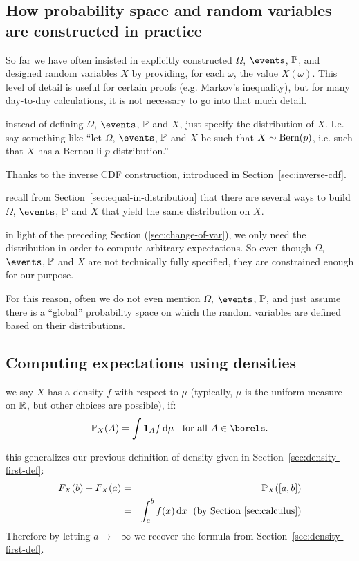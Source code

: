 \documentclass{article}
\begin{document}
\subsection{How probability space and random variables are constructed in practice}\label{sec:using-rv-to-construct-prs}

So far we have often insisted in explicitly constructed $\Omega$, $\events$, $\P$, and designed random variables $X$ by providing, for each $\omega$, the value $X(\omega)$. This level of detail is useful for certain proofs (e.g. Markov's inequality), but for many day-to-day calculations, it is not necessary to go into that much detail. 

 instead of defining $\Omega$, $\events$, $\P$ and $X$, just specify the distribution of $X$. I.e. say something like ``let $\Omega$, $\events$, $\P$ and $X$ be such that $X \sim \Bern(p)$, i.e. such that $X$ has a Bernoulli $p$ distribution.'' 

 Thanks to the inverse CDF construction, introduced in Section~\ref{sec:inverse-cdf}. 

 recall from Section~\ref{sec:equal-in-distribution} that there are several ways to build $\Omega$, $\events$, $\P$ and $X$ that yield the same distribution on $X$.

 in light of the preceding Section (\ref{sec:change-of-var}), we only need the distribution in order to compute arbitrary expectations. So even though $\Omega$, $\events$, $\P$ and $X$ are not technically fully specified, they are constrained enough for our purpose.

For this reason, often we do not even mention $\Omega$, $\events$, $\P$, and just assume there is a ``global'' probability space on which the random variables are defined based on their distributions. 


\subsection{Computing expectations using densities}

 we say $X$ has a density $f$ with respect to $\mu$ (typically, $\mu$ is the uniform measure on $\R$, but other choices are possible), if:
\[ \P_X(A) = \int \1_A f \ud \mu \;\;\text{ for all }A\in\borels. \]

 this generalizes our previous definition of density given in Section~\ref{sec:density-first-def}:
\begin{eqnarray*} 
F_X(b) - F_X(a) &=& \P_X([a, b]) \\
&=& \int_a^b f(x) \ud x \;\text{ (by Section~\ref{sec:calculus})}
\end{eqnarray*}
Therefore by letting $a \to -\infty$ we recover the formula from Section~\ref{sec:density-first-def}.
\end{document}
